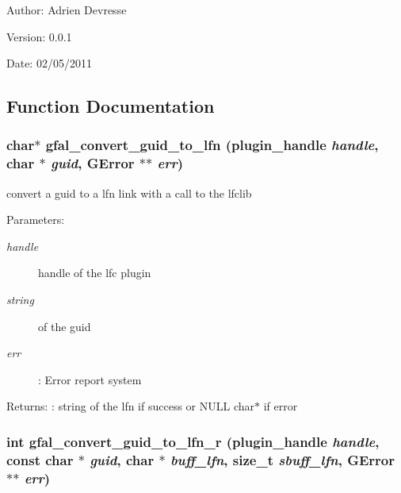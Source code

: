 \begin{Desc}
\item[Author:]Adrien Devresse \end{Desc}
\begin{Desc}
\item[Version:]0.0.1 \end{Desc}
\begin{Desc}
\item[Date:]02/05/2011 \end{Desc}


\subsection{Function Documentation}
\subsubsection{\setlength{\rightskip}{0pt plus 5cm}char$\ast$ gfal\_\-convert\_\-guid\_\-to\_\-lfn (plugin\_\-handle {\em handle}, char $\ast$ {\em guid}, GError $\ast$$\ast$ {\em err})}\label{lfc__ifce__ng_8h_4bfe1a660a34d4e1e8a5d220ee256ff5}


convert a guid to a lfn link with a call to the lfclib \begin{Desc}
\item[Parameters:]
\begin{description}
\item[{\em handle}]handle of the lfc plugin \item[{\em string}]of the guid \item[{\em err}]: Error report system \end{description}
\end{Desc}
\begin{Desc}
\item[Returns:]: string of the lfn if success or NULL char$\ast$ if error \end{Desc}
\subsubsection{\setlength{\rightskip}{0pt plus 5cm}int gfal\_\-convert\_\-guid\_\-to\_\-lfn\_\-r (plugin\_\-handle {\em handle}, const char $\ast$ {\em guid}, char $\ast$ {\em buff\_\-lfn}, size\_\-t {\em sbuff\_\-lfn}, GError $\ast$$\ast$ {\em err})}\label{lfc__ifce__ng_8h_70f8470c60821b33776b4504d6bb4610}



